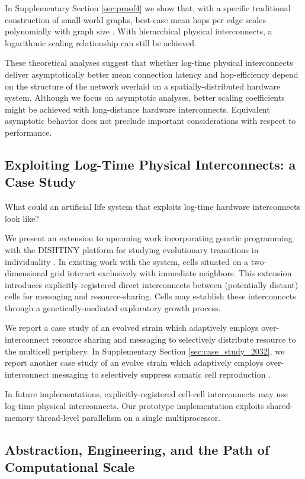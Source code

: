 In Supplementary Section \ref{sec:proof4} we show that, with a specific traditional construction of small-world graphs, best-case mean hops per edge scales polynomially with graph size \citep{Moreno_Ofria_2020}.
With hierarchical physical interconnects, a logarithmic scaling relationship can still be achieved.

These theoretical analyses suggest that whether log-time physical interconnects deliver asymptotically better mean connection latency and hop-efficiency depend on the structure of the network overlaid on a spatially-distributed hardware system.
Although we focus on asymptotic analyses, better scaling coefficients might be achieved with long-distance hardware interconnects.
Equivalent asymptotic behavior does not preclude important considerations with respect to performance.

\subsection{Exploiting Log-Time Physical Interconnects: a Case Study}

What could an artificial life system that exploits log-time hardware interconnects look like?

We present an extension to upcoming work incorporating genetic programming with the DISHTINY platform for studying evolutionary transitions in individuality \citep{moreno2019toward}.
In existing work with the system, cells situated on a two-dimensional grid interact exclusively with immediate neighbors.
This extension introduces explicitly-registered direct interconnects between (potentially distant) cells for messaging and resource-sharing.
Cells may establish these interconnects through a genetically-mediated exploratory growth process.

We report a case study of an evolved strain which adaptively employs over-interconnect resource sharing and messaging to selectively distribute resource to the multicell periphery.
In Supplementary Section \ref{sec:case_study_2032}, we report another case study of an evolve strain which adaptively employs over-interconnect messaging to selectively suppress somatic cell reproduction \citep{Moreno_Ofria_2020}.

In future implementations, explicitly-registered cell-cell interconnects may use log-time physical interconnects.
Our prototype implementation exploits shared-memory thread-level parallelism on a single multiprocessor.

\subsection{Abstraction, Engineering, and the Path of Computational Scale}

